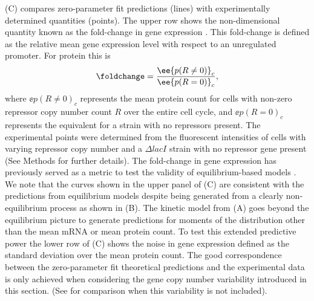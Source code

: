 (C) compares zero-parameter fit predictions (lines) with
experimentally determined quantities (points). The upper row shows the
non-dimensional quantity known as the fold-change in gene expression
\cite{Garcia2011c}. This fold-change is defined as the relative mean gene
expression level with respect to an unregulated promoter. For protein this is
\begin{equation}
	\foldchange = {\ee{p(R \neq 0)}_c \over \ee{p(R = 0)}_c},
\end{equation}
where $\ee{p(R \neq 0)}_c$ represents the mean protein count for cells with
non-zero repressor copy number count $R$ over the entire cell cycle, and
$\ee{p(R = 0)}_c$ represents the equivalent for a strain with no repressors
present. The experimental points were determined from the fluorescent
intensities of cells with varying repressor copy number and a $\Delta lacI$
strain with no repressor gene present (See Methods for further details). The
fold-change in gene expression has previously served as a metric to test the
validity of equilibrium-based models \cite{Phillips2015}. We note that the
curves shown in the upper panel of (C) are consistent
with the predictions from equilibrium models \cite{Razo-Mejia2018} despite
being generated from a clearly non-equilibrium process as shown in
(B). The kinetic model from (A)
goes beyond the equilibrium picture to generate predictions for moments of the
distribution other than the mean mRNA or mean protein count. To test this
extended predictive power the lower row of (C) shows the
noise in gene expression defined as the standard deviation over the mean
protein count. The good correspondence between the zero-parameter fit
theoretical predictions and the experimental data is only achieved when
considering the gene copy number variability introduced in this section. (See
 for comparison when this variability is not included).

